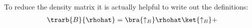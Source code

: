 To reduce the density matrix it is actually helpful to write out the definitions:
\begin{align}
\trarb{B}{\rhohat} = \bra{\uparrow_B}\rhohat\ket{\uparrow_B}+
\end{align}